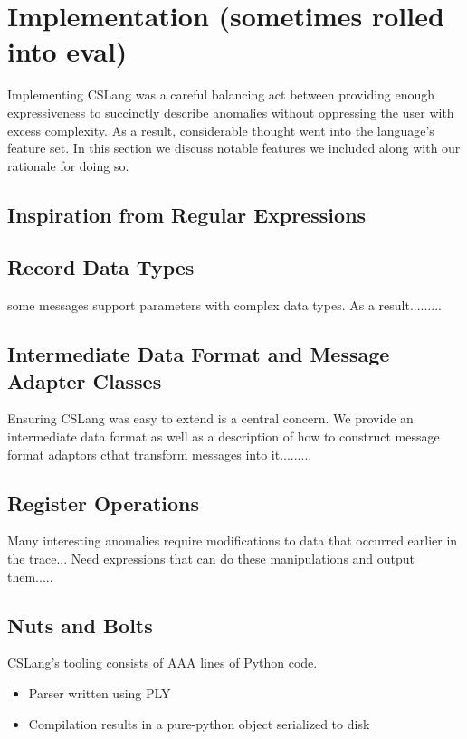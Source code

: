 \section{Implementation (sometimes rolled into eval)}
\label{SEC:implementation}

Implementing CSLang was a careful balancing act between providing enough
expressiveness to succinctly describe anomalies without oppressing the user
with excess complexity.  As a result, considerable thought went into the
language's feature set.  In this section we discuss notable features we
included along with our rationale for doing so.

\subsection{Inspiration from Regular Expressions}


\subsection{Record Data Types}

some messages support parameters with complex data types.  As a
result.........

\subsection{Intermediate Data Format and Message Adapter Classes}

Ensuring CSLang was easy to extend is a central concern.  We provide an
intermediate data format as well as a description of how to construct
message format adaptors cthat transform messages into it.........

\subsection{Register Operations}

Many interesting anomalies require modifications to data that occurred
earlier in the trace...  Need expressions that can do these manipulations
and output them.....


\subsection{Nuts and Bolts}
CSLang's tooling consists of AAA lines of Python code.
\begin{itemize}
\item{Parser written using PLY}
\item{Compilation results in a pure-python object serialized to disk}
\end{itemize}

